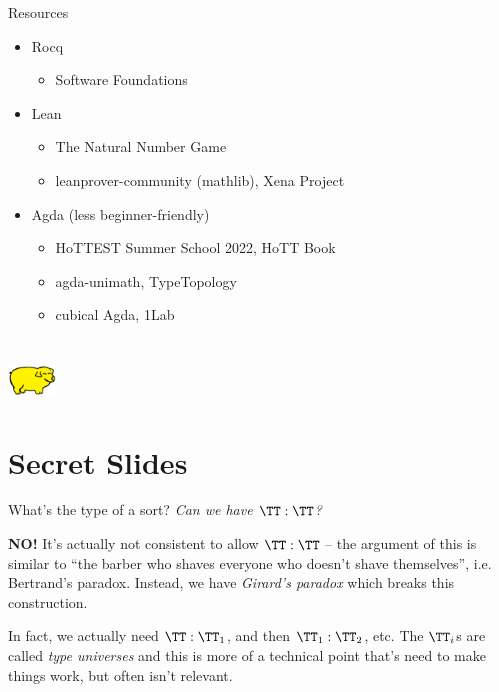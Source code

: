 \documentclass{beamer}
\begin{document}
\begin{frame}{Resources}
  \begin{itemize}
    \item Rocq
      \begin{itemize}
        \item Software Foundations
      \end{itemize}
    \item Lean 
      \begin{itemize}
        \item The Natural Number Game
        \item leanprover-community (mathlib), Xena Project  
      \end{itemize}
    \item Agda {\scriptsize(less beginner-friendly)}
      \begin{itemize}
        \item HoTTEST Summer School 2022, HoTT Book
        \item agda-unimath, TypeTopology
        \item cubical Agda, 1Lab 
      \end{itemize}
  \end{itemize}
\end{frame}

\section{\texorpdfstring{\includegraphics[width=36pt]{yellowPig.png}}{P.I.G.}}

\backupbegin

\section{Secret Slides}

\begin{frame}{What's the type of a sort?}
  \emph{Can we have $\TT : \TT$?}
  \pause \vspace{12pt}

  \textbf{NO!} It's actually not consistent to allow $\TT :
    \TT$  -- the argument of this
    is similar to ``the barber who shaves everyone who doesn't shave
    themselves'', i.e. Bertrand's paradox.
    Instead, we have \emph{Girard's
    paradox} which breaks this construction. 
    \pause \vspace{12pt}

    In fact, we actually
    need $\TT : \TT_1$, and then $\TT_1 : \TT_2$, etc. The $\TT_i$s are called
    \emph{type universes} and this is more of a technical point that's need to
    make things work, but often isn't relevant.  
\end{frame}
\end{document}
